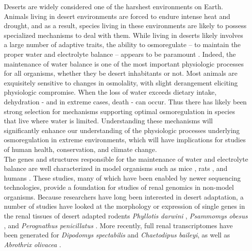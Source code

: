 \documentclass[11pt]{article}
\begin{document}
Deserts are widely considered one of the harshest environments on Earth. Animals living in desert environments are forced to endure intense heat and drought, and as a result, species living in these environments are likely to possess specialized mechanisms to deal with them. While living in deserts likely involves a large number of adaptive traits, the ability to osmoregulate -- to maintain the proper water and electrolyte balance -- appears to be paramount \cite{Walsberg:2000uu}. Indeed, the maintenance of water balance is one of the most important physiologic processes for all organisms, whether they be desert inhabitants or not. Most animals are exquisitely sensitive to changes in osmolality, with slight derangement eliciting physiologic compromise.  When the loss of water exceeds dietary intake, dehydration - and in extreme cases, death - can occur. Thus there has likely been strong selection for mechanisms supporting optimal osmoregulation in species that live where water is limited. Understanding these mechanisms will significantly enhance our understanding of the physiologic processes underlying osmoregulation in extreme environments, which will have implications for studies of human health, conservation, and climate change. \\

The genes and structures responsible for the maintenance of water and electrolyte balance are well characterized in model organisms such as mice \cite{Tatum:2009kp}, rats \cite{Romero:2007fs,Rojek:2006dg,NIELSEN:1995uq}, and humans \cite{Mobasheri:2007tt,Bedford:2003wa,NIELSEN:1999vg}. These studies, many of which have been enabled by newer sequencing technologies, provide a foundation for studies of renal genomics in non-model organisms. Because researchers have long been interested in desert adaptation, a number of studies have looked at the morphology or expression of single genes in the renal tissues of desert adapted rodents \textit{Phyllotis darwini} \cite{Gallardo:2005fm}, \textit{Psammomys obesus} \cite{Kaissling:1975uu}, and \textit{Perognathus penicillatus} \cite{Altschuler:1979du}. More recently, full renal transcriptomes have been generated for \textit{Dipodomys spectabilis} and \textit{Chaetodipus baileyi}, \cite{Marra:2014de} as well as \textit{Abrothrix olivacea} \cite{Giorello:2014iv}. \\
\end{document}
